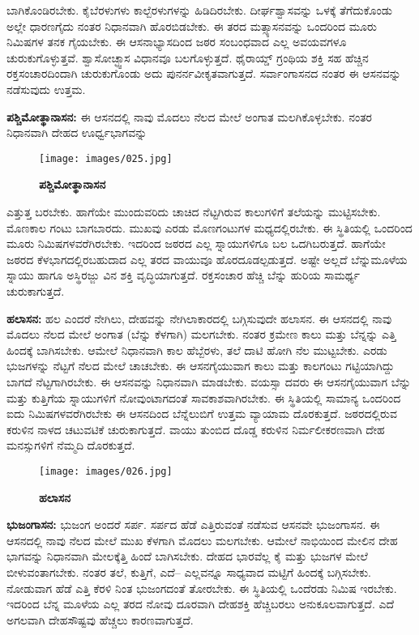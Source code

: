 ಬಾಗಿಕೊಂಡಿರಬೇಕು. ಕೈಬೆರಳುಗಳು ಕಾಲ್ಬೆರಳುಗಳನ್ನು ಹಿಡಿದಿರಬೇಕು. ದೀರ್ಘಶ್ವಾಸವನ್ನು ಒಳಕ್ಕೆ ತೆಗೆದುಕೊಂಡು ಅಲ್ಲೇ ಧಾರಣಗೈದು ನಂತರ ನಿಧಾನವಾಗಿ ಹೊರಬಿಡಬೇಕು. ಈ ತರದ ಮತ್ಸ್ಯಾಸನವನ್ನು ಒಂದರಿಂದ ಮೂರು ನಿಮಿಷಗಳ ತನಕ ಗೈಯಬೇಕು. ಈ ಆಸನಾಭ್ಯಾಸದಿಂದ ಜಠರ ಸಂಬಂಧವಾದ ಎಲ್ಲ ಅವಯವಗಳೂ ಚುರುಕುಗೊಳ್ಳುತ್ತವೆ. ಶ್ವಾಸೋಚ್ಛ್ವಾಸ ವಿಧಾನವೂ ಬಲಗೊಳ್ಳುತ್ತದೆ. ಥೈರಾಯ್ಡ್ ಗ್ರಂಥಿಯ ಶಕ್ತಿ ಸಹ ಹೆಚ್ಚಿನ ರಕ್ತಸಂಚಾರದಿಂದಾಗಿ ಚುರುಕುಗೊಂಡು ಅದು ಪುನರ್ನವೀಕೃತವಾಗುತ್ತದೆ. ಸರ್ವಾಂಗಾಸನದ ನಂತರ ಈ ಆಸನವನ್ನು ನಡೆಸುವುದು ಉತ್ತಮ.

\textbf{  ಪಶ್ಚಿಮೋತ್ಥಾನಾಸನ:} ಈ ಆಸನದಲ್ಲಿ ನಾವು ಮೊದಲು ನೆಲದ ಮೇಲೆ ಅಂಗಾತ ಮಲಗಿಕೊಳ್ಳಬೇಕು. ನಂತರ ನಿಧಾನವಾಗಿ ದೇಹದ ಊರ್ಧ್ವಭಾಗವನ್ನು

\begin{figure}
\texttt{[image: images/025.jpg]}
\caption{ \textbf{ಪಶ್ಚಿಮೋತ್ಥಾನಾಸನ} }
\end{figure}

ಎತ್ತುತ್ತ ಬರಬೇಕು. ಹಾಗೆಯೇ ಮುಂದುವರಿದು ಚಾಚಿದ ನೆಟ್ಟಗಿರುವ ಕಾಲುಗಳಿಗೆ ತಲೆಯನ್ನು ಮುಟ್ಟಿಸಬೇಕು. ಮೊಣಕಾಲ ಗಂಟು ಬಾಗಬಾರದು. ಮುಖವು ಎರಡು ಮೊಣಗಂಟುಗಳ ಮಧ್ಯದಲ್ಲಿರಬೇಕು. ಈ ಸ್ಥಿತಿಯಲ್ಲಿ ಒಂದರಿಂದ ಮೂರು ನಿಮಿಷಗಳವರೆಗಿರಬೇಕು. ಇದರಿಂದ ಜಠರದ ಎಲ್ಲ ಸ್ನಾಯುಗಳಿಗೂ ಬಲ ಒದಗಿಬರುತ್ತದೆ. ಹಾಗೆಯೇ ಜಠರದ ಕೆಳಭಾಗದಲ್ಲಿರಬಹುದಾದ ಎಲ್ಲ ತರದ ವಾಯುವೂ  ಹೊರದೂಡಲ್ಪಡುತ್ತದೆ. ಅಷ್ಟೇ ಅಲ್ಲದೆ ಬೆನ್ನುಮೂಳೆಯ ಸ್ನಾಯು ಹಾಗೂ ಅಸ್ಥಿರಜ್ಜು  ವಿನ ಶಕ್ತಿ ವೃದ್ಧಿಯಾಗುತ್ತದೆ. ರಕ್ತಸಂಚಾರ ಹೆಚ್ಚಿ ಬೆನ್ನು ಹುರಿಯ ಸಾಮರ್ಥ್ಯ ಚುರುಕಾಗುತ್ತದೆ.

\textbf{  ಹಲಾಸನ:} ಹಲ ಎಂದರೆ ನೇಗಿಲು, ದೇಹವನ್ನು ನೇಗಿಲಾಕಾರದಲ್ಲಿ ಬಗ್ಗಿಸುವುದೇ ಹಲಾಸನ. ಈ ಆಸನದಲ್ಲಿ ನಾವು ಮೊದಲು ನೆಲದ ಮೇಲೆ ಅಂಗಾತ (ಬೆನ್ನು ಕೆಳಗಾಗಿ) ಮಲಗಬೇಕು. ನಂತರ ಕ್ರಮೇಣ ಕಾಲು ಮತ್ತು ಬೆನ್ನನ್ನು ಎತ್ತಿ ಹಿಂದಕ್ಕೆ ಬಾಗಿಸಬೇಕು. ಆಮೇಲೆ ನಿಧಾನವಾಗಿ ಕಾಲ ಹೆಬ್ಬೆರಳು, ತಲೆ ದಾಟಿ ಹೋಗಿ ನೆಲ ಮುಟ್ಟಬೇಕು. ಎರಡು ಭುಜಗಳನ್ನು ನೆಟ್ಟಗೆ ನೆಲದ ಮೇಲೆ ಚಾಚಬೇಕು. ಈ ಆಸನಗೈಯುವಾಗ ಕಾಲು ಮತ್ತು ಕಾಲಗಂಟು ಗಟ್ಟಿಯಾಗಿದ್ದು ಬಾಗದೆ ನೆಟ್ಟಗಾಗಿರಬೇಕು. ಈ ಆಸನವನ್ನು ನಿಧಾನವಾಗಿ ಮಾಡಬೇಕು. ವಯಸ್ಸಾ ದವರು ಈ ಆಸನಗೈಯುವಾಗ ಬೆನ್ನು ಮತ್ತು ಕುತ್ತಿಗೆಯ ಸ್ನಾಯುಗಳಿಗೆ ನೋವುಂಟಾಗದಂತೆ ಸಾವಕಾಶವಾಗಿರಬೇಕು. ಈ ಸ್ಥಿತಿಯಲ್ಲಿ ಸಾಮಾನ್ಯ ಒಂದರಿಂದ ಐದು ನಿಮಿಷಗಳವರೆಗಿರಬೇಕು ಈ ಆಸನದಿಂದ ಬೆನ್ನೆಲುಬಿಗೆ ಉತ್ತಮ ವ್ಯಾಯಾಮ ದೊರಕುತ್ತದೆ. ಜಠರದಲ್ಲಿರುವ ಕರುಳಿನ ನಾಳದ ಚಟುವಟಿಕೆ ಚುರುಕಾಗುತ್ತದೆ. ವಾಯು ತುಂಬಿದ ದೊಡ್ಡ ಕರುಳಿನ ನಿರ್ಮಲೀಕರಣವಾಗಿ ದೇಹ ಮನಸ್ಸುಗಳಿಗೆ ನೆಮ್ಮದಿ ದೊರಕುತ್ತದೆ.

\begin{figure}
\texttt{[image: images/026.jpg]}
\caption{ \textbf{ಹಲಾಸನ} }
\end{figure}

\textbf{  ಭುಜಂಗಾಸನ:} ಭುಜಂಗ ಅಂದರೆ ಸರ್ಪ. ಸರ್ಪದ ಹೆಡೆ ಎತ್ತಿರುವಂತೆ ನಡೆಸುವ ಆಸನವೇ ಭುಜಂಗಾಸನ. ಈ ಆಸನದಲ್ಲಿ ನಾವು ನೆಲದ ಮೇಲೆ ಮುಖ ಕೆಳಗಾಗಿ ಮೊದಲು ಮಲಗಬೇಕು. ಆಮೇಲೆ ನಾಭಿಯಿಂದ ಮೇಲಿನ ದೇಹ ಭಾಗವನ್ನು ನಿಧಾನವಾಗಿ ಮೇಲಕ್ಕೆತ್ತಿ ಹಿಂದೆ ಬಾಗಿಸಬೇಕು. ದೇಹದ ಭಾರವೆಲ್ಲ ಕೈ ಮತ್ತು ಭುಜಗಳ ಮೇಲೆ ಬೀಳುವಂತಾಗಬೇಕು. ನಂತರ ತಲೆ, ಕುತ್ತಿಗೆ, ಎದೆ– ಎಲ್ಲವನ್ನೂ ಸಾಧ್ಯವಾದ ಮಟ್ಟಿಗೆ ಹಿಂದಕ್ಕೆ ಬಗ್ಗಿಸಬೇಕು. ನೋಡುವಾಗ ಹೆಡೆ ಎತ್ತಿ ಕೆರಳಿ ನಿಂತ ಭುಜಂಗದಂತೆ ತೋರಬೇಕು. ಈ ಸ್ಥಿತಿಯಲ್ಲಿ ಒಂದೆರಡು ನಿಮಿಷ ಇರಬೇಕು. ಇದರಿಂದ ಬೆನ್ನ ಮೂಳೆಯ ಎಲ್ಲ ತರದ ನೋವು ದೂರವಾಗಿ ದೇಹಶಕ್ತಿ ಹೆಚ್ಚಿಬರಲು ಅನುಕೂಲವಾಗುತ್ತದೆ. ಎದೆ ಅಗಲವಾಗಿ ದೇಹಸೌಷ್ಟವು ಹೆಚ್ಚಲು ಕಾರಣವಾಗುತ್ತದೆ.

